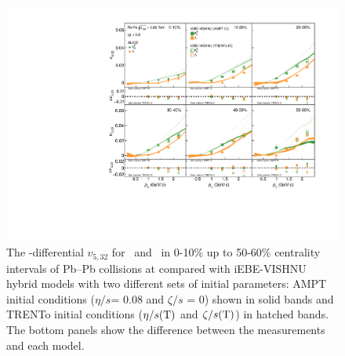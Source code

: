  \begin{figure}[h]
\begin{center}
\includegraphics[scale=0.73]{figures/model/TrentoAndAMPT_v523_gap00_LambdaK0s.pdf}
\end{center}
\caption{The \pT-differential $v_{5,32}$ for \Ks~and \lambdas~in 0-10\% up to 50-60\% centrality intervals of Pb--Pb collisions at \sNN compared with iEBE-VISHNU hybrid models with two different sets of initial parameters: AMPT initial conditions ($\eta/s$= 0.08 and $\zeta/s$ = 0) shown in solid bands and TRENTo initial conditions ($\eta/s({\rm T})$ and $\zeta/s({\rm T})$) in hatched bands. The bottom panels show the difference between the measurements and each model.}
\label{v523_model_KL}
\end{figure}



